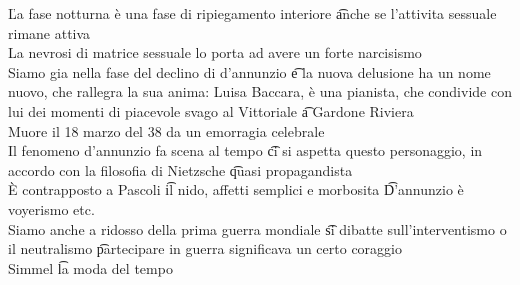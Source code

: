 \documentclass[12pt]{article}
\begin{document}
\v

La fase notturna è una fase di ripiegamento interiore \t anche se l'attivita sessuale rimane attiva \\
La nevrosi di matrice sessuale lo porta ad avere un forte narcisismo \\
Siamo gia nella fase del declino di d'annunzio \t e la nuova delusione ha un nome nuovo, che rallegra la sua anima: Luisa Baccara, è una pianista, che condivide con lui dei momenti di piacevole svago al Vittoriale \t a Gardone Riviera \\
Muore il 18 marzo del 38 da un emorragia celebrale \\
Il fenomeno d'annunzio fa scena al tempo \t ci si aspetta questo personaggio, in accordo con la filosofia di Nietzsche \t quasi propagandista \\
È contrapposto a Pascoli \t il nido, affetti semplici e morbosita \t D'annunzio è voyerismo etc. \\
Siamo anche a ridosso della prima guerra mondiale \t si dibatte sull'interventismo o il neutralismo \t partecipare in guerra significava un certo coraggio \\
Simmel \t la moda del tempo
\end{document}
